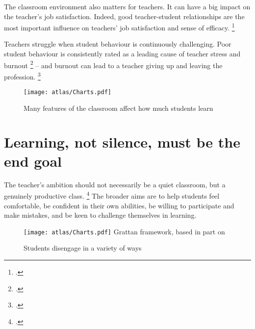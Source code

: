 \documentclass[FrontPage]{grattan}
\begin{document}
The classroom environment also matters for teachers. 
It can have a big impact on the teacher's job satisfaction. Indeed, good teacher-student relationships are the most important influence on teachers' job satisfaction and sense of efficacy.%
    \footcite[][144]{Freeman2014AustralianTeachersLearning}  

Teachers struggle when student behaviour is continuously challenging. Poor student behaviour is consistently rated as a leading cause of teacher stress and burnout%
    \footcites{Lewis2005TeachersClassroomDiscipline}{Stoughton2007HowWillI}
 -- and burnout can lead to a teacher giving up and leaving the profession.%
    \footcite{Goddard2006BeginningTeacherBurnout} 

\begin{figure}
\caption{Many features of the classroom affect how much students learn\label{fig:classroom-environment-factors}}%
\texttt{[image: atlas/Charts.pdf]}
%
{\textcite{Hattie2008visiblelearningsynthesis}}
\end{figure}


\section{Learning, not silence, must be the end goal}\label{sec:learning-not-silence}
The teacher's ambition should not necessarily be a quiet classroom, but a genuinely productive class. \footcite{Watkins2013DisposedToLearn} The broader aims are to help students feel comfortable, be confident in their own abilities, be willing to participate and make mistakes, and be keen to challenge themselves in learning. 

\begin{figure}
\caption{Students disengage in a variety of ways\label{fig:students-disengage-variety-ways}}
\texttt{[image: atlas/Charts.pdf]}
%
{Grattan framework, based in part on \textcites{Angus2009PipelineProject}{Sullivan2014PunishThemEngage}}
\end{figure}
 
\end{document}
